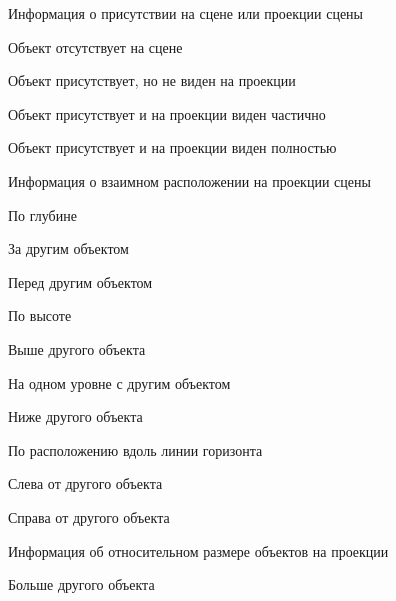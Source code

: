 \begin{textitemize}
    \item Информация о присутствии на сцене или проекции сцены
    \begin{textitemize}
        \item Объект отсутствует на сцене
        \item Объект присутствует, но не виден на проекции
        \item Объект присутствует и на проекции виден частично
        \item Объект присутствует и на проекции виден полностью
    \end{textitemize}
    \item Информация о взаимном расположении на проекции сцены
    \begin{textitemize}
        \item По глубине
        \begin{textitemize}
            \item За другим объектом
            \item Перед другим объектом
        \end{textitemize}
    \end{textitemize}
    \begin{textitemize}
        \item По высоте
        \begin{textitemize}
            \item Выше другого объекта
            \item На одном уровне с другим объектом
            \item Ниже другого объекта
        \end{textitemize}
    \end{textitemize}
    \begin{textitemize}
        \item По расположению вдоль линии горизонта
        \begin{textitemize}
            \item Слева от другого объекта
            \item Справа от другого объекта
        \end{textitemize}
    \end{textitemize}
    \item Информация об относительном размере объектов на проекции
    \begin{textitemize}
        \item Больше другого объекта

\end{textitemize}
\end{textitemize}
